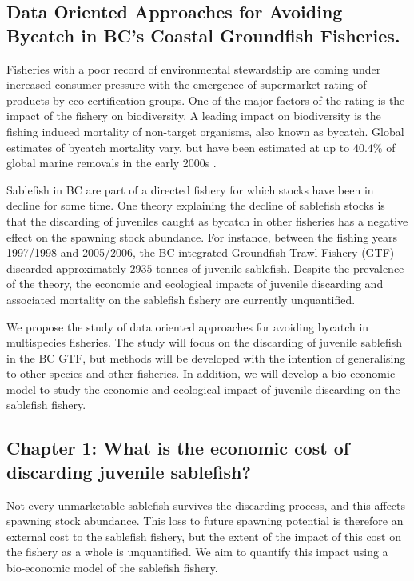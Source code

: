 \documentclass[11pt]{article}
\begin{document}
\subsection*{Data Oriented Approaches for Avoiding Bycatch in BC's Coastal Groundfish Fisheries.}

Fisheries with a poor record of environmental stewardship are coming under increased consumer pressure with the emergence of supermarket rating of products by eco-certification groups. One of the major factors of the rating is the impact of the fishery on biodiversity. A leading impact on biodiversity is the fishing induced mortality of non-target organisms, also known as bycatch. Global estimates of bycatch mortality vary, but have been estimated at up to $40.4\%$ of global marine removals in the early 2000s \citep{davies2009defining}.

Sablefish in BC are part of a directed fishery for which stocks have been in decline for some time. One theory explaining the decline of sablefish stocks is that the discarding of juveniles caught as bycatch in other fisheries has a negative effect on the spawning stock abundance. For instance, between the fishing years 1997/1998 and 2005/2006, the BC integrated Groundfish Trawl Fishery (GTF) discarded approximately $2935$ tonnes of juvenile sablefish. Despite the prevalence of the theory, the economic and ecological impacts of juvenile discarding and associated mortality on the sablefish fishery are currently unquantified.

We propose the study of data oriented approaches for avoiding bycatch in multispecies fisheries. The study will focus on the discarding of juvenile sablefish in the BC GTF, but methods will be developed with the intention of generalising to other species and other fisheries. In addition, we will develop a bio-economic model to study the economic and ecological impact of juvenile discarding on the sablefish fishery.

\subsection*{Chapter 1: What is the economic cost of discarding juvenile sablefish?}
Not every unmarketable sablefish survives the discarding process, and this affects spawning stock abundance. This loss to future spawning potential is therefore an external cost to the sablefish fishery, but the extent of the impact of this cost on the fishery as a whole is unquantified. We aim to quantify this impact using a bio-economic model of the sablefish fishery.
\end{document}
